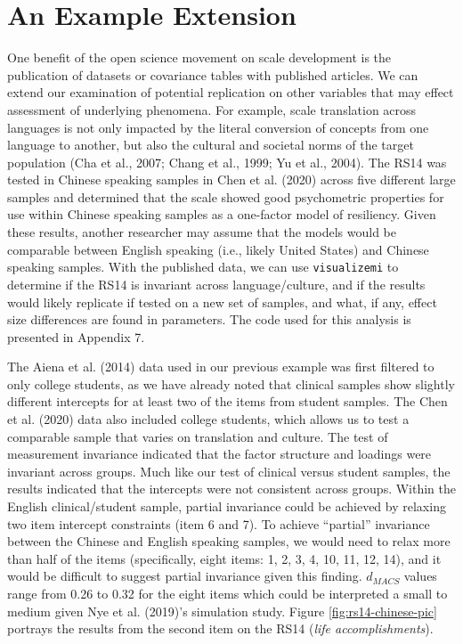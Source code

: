 \documentclass[
  man,floatsintext]{apa7}
\begin{document}
\section{An Example Extension}\label{an-example-extension}

One benefit of the open science movement on scale development is the publication of datasets or covariance tables with published articles. We can extend our examination of potential replication on other variables that may effect assessment of underlying phenomena. For example, scale translation across languages is not only impacted by the literal conversion of concepts from one language to another, but also the cultural and societal norms of the target population (Cha et al., 2007; Chang et al., 1999; Yu et al., 2004). The RS14 was tested in Chinese speaking samples in Chen et al. (2020) across five different large samples and determined that the scale showed good psychometric properties for use within Chinese speaking samples as a one-factor model of resiliency. Given these results, another researcher may assume that the models would be comparable between English speaking (i.e., likely United States) and Chinese speaking samples. With the published data, we can use \texttt{visualizemi} to determine if the RS14 is invariant across language/culture, and if the results would likely replicate if tested on a new set of samples, and what, if any, effect size differences are found in parameters. The code used for this analysis is presented in Appendix 7.

The Aiena et al. (2014) data used in our previous example was first filtered to only college students, as we have already noted that clinical samples show slightly different intercepts for at least two of the items from student samples. The Chen et al. (2020) data also included college students, which allows us to test a comparable sample that varies on translation and culture. The test of measurement invariance indicated that the factor structure and loadings were invariant across groups. Much like our test of clinical versus student samples, the results indicated that the intercepts were not consistent across groups. Within the English clinical/student sample, partial invariance could be achieved by relaxing two item intercept constraints (item 6 and 7). To achieve ``partial'' invariance between the Chinese and English speaking samples, we would need to relax more than half of the items (specifically, eight items: 1, 2, 3, 4, 10, 11, 12, 14), and it would be difficult to suggest partial invariance given this finding. \(d_{MACS}\) values range from 0.26 to 0.32 for the eight items which could be interpreted a small to medium given Nye et al. (2019)'s simulation study. Figure \ref{fig:rs14-chinese-pic} portrays the results from the second item on the RS14 (\emph{life accomplishments}).
\end{document}
